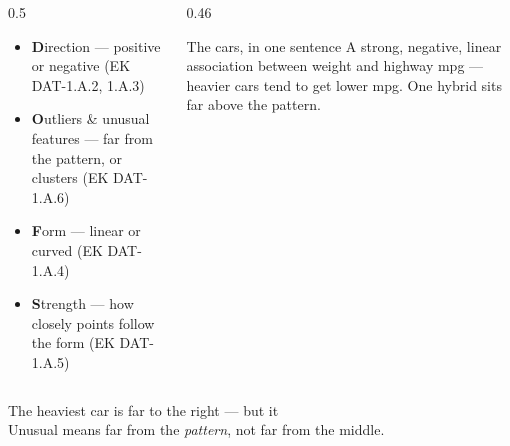 \documentclass[aspectratio=169, 11pt]{beamer}
\begin{document}
\begin{frame}[t, plain]
  \begin{columns}[T]
    \begin{column}{0.5\textwidth}
      \begin{itemize}\setlength{\itemsep}{5pt}
        \item \textbf{D}irection --- positive or negative (EK DAT-1.A.2, 1.A.3)
        \item \textbf{O}utliers \& unusual features --- far from the pattern, or clusters
              (EK DAT-1.A.6)
        \item \textbf{F}orm --- linear or curved (EK DAT-1.A.4)
        \item \textbf{S}trength --- how closely points follow the form (EK DAT-1.A.5)
      \end{itemize}
    \end{column}
    \begin{column}{0.46\textwidth}
      \begin{block}{The cars, in one sentence}
        A strong, negative, linear association between weight and highway mpg --- heavier
        cars tend to get lower mpg. One hybrid sits far above the pattern.
      \end{block}
    \end{column}
  \end{columns}
  \vspace{10pt}
  \begin{center}
    {\large The heaviest car is far to the right --- but it }\\[4pt]
    {\small\color{slate} Unusual means far from the \emph{pattern}, not far from the middle.}
  \end{center}
\end{frame}
\end{document}
